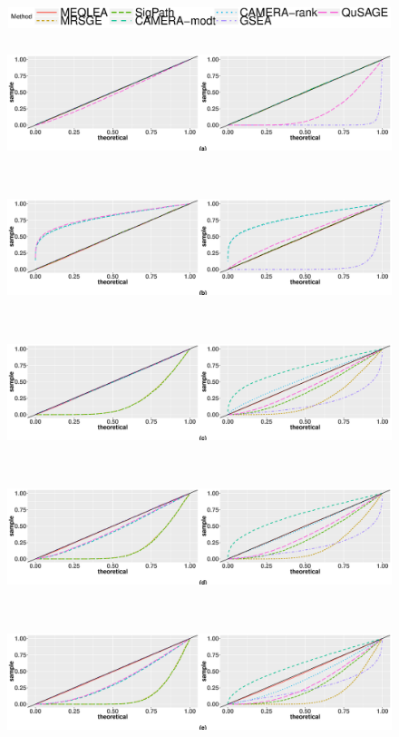 \documentclass[a4,center,fleqn]{NAR}
\begin{document}
	
	\begin{figure}[!ht]
		\begin{center}
			\includegraphics[width=20cm,height=0.6cm]{Figures/parallel_legend.eps}
			\includegraphics[width=18cm,height=4.1cm]{Figures/parallel_a.eps}
			\includegraphics[width=18cm,height=4.1cm]{Figures/parallel_b.eps}
			\includegraphics[width=18cm,height=4.1cm]{Figures/parallel_c.eps}
			\includegraphics[width=18cm,height=4.1cm]{Figures/parallel_d.eps}
			\includegraphics[width=18cm,height=4.1cm]{Figures/parallel_e.eps}

\end{center}
\end{figure}
\end{document}
